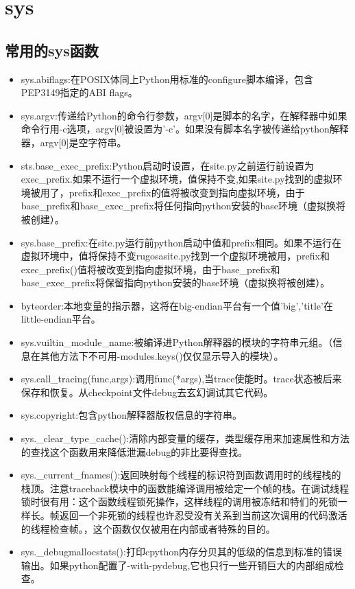 \chapter{sys}
\section{常用的sys函数}
\begin{itemize}
\item sys.abiflags:在POSIX体同上Python用标准的configure脚本编译，包含PEP3149指定的ABI flags。
\item sys.argv:传递给Python的命令行参数，argv[0]是脚本的名字，在解释器中如果命令行用-c选项，argv[0]被设置为'-c'。如果没有脚本名字被传递给python解释器，argv[0]是空字符串。
\item sts.base\_exec\_prefix:Python启动时设置，在site.py之前运行前设置为exec\_prefix.如果不运行一个虚拟环境，值保持不变,如果site.py找到的虚拟环境被用了，prefix和exec\_prefix的值将被改变到指向虚拟环境，由于base\_prefix和base\_exec\_prefix将任何指向python安装的base环境（虚拟换将被创建）。
\item sys.base\_prefix:在site.py运行前python启动中值和prefix相同。如果不运行在虚拟环境中，值将保持不变rugosasite.py找到一个虚拟环境被用，prefix和exec\_prefix()值将被改变到指向虚拟环境，由于base\_prefix和base\_exec\_prefix将保留指向python安装的base环境（虚拟换将被创建）。
\item byteorder:本地变量的指示器，这将在big-endian平台有一个值'big','title'在little-endian平台。
\item sys.vuiltin\_module\_name:被编译进Python解释器的模块的字符串元组。（信息在其他方法下不可用-modules.keys()仅仅显示导入的模块）。
\item sys.call\_tracing(func,args):调用func(*args),当trace使能时。trace状态被后来保存和恢复。从checkpoint文件debug去玄幻调试其它代码。
\item sys.copyright:包含python解释器版权信息的字符串。
\item sys.\_clear\_type\_cache():清除内部变量的缓存，类型缓存用来加速属性和方法的查找这个函数用来降低泄漏debug的非比要得查找。
\item sys.\_current\_fnames():返回映射每个线程的标识符到函数调用时的线程栈的栈顶。注意traceback模块中的函数能编译调用被给定一个帧的栈。在调试线程锁时很有用：这个函数线程锁死操作，这样线程的调用被冻结和特们的死锁一样长。帧返回一个非死锁的线程也许忍受没有关系到当前这次调用的代码激活的线程检查帧。，这个函数仅仅被用在内部或者特殊的目的。
\item sys.\_debugmallocstats():打印cpython内存分贝其的低级的信息到标准的错误输出。如果python配置了-with-pydebug,它也只行一些开销巨大的内部组成检查。

\end{itemize}
